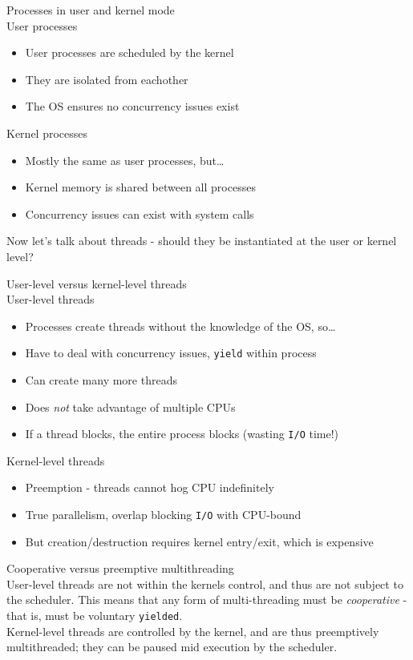 \documentclass[journal, letterpaper]{IEEEtran}
\begin{document}
\begin{theory}{Processes in user and kernel mode} \\
    User processes
    \begin{itemize}
        \item User processes are scheduled by the kernel
        \item They are isolated from eachother
        \item The OS ensures no concurrency issues exist
    \end{itemize}
    Kernel processes
    \begin{itemize}
        \item Mostly the same as user processes, but\dots
        \item Kernel memory is shared between all processes
        \item Concurrency issues can exist with system calls
    \end{itemize}
\end{theory}
Now let's talk about threads - should they be instantiated at the user or kernel level? 
\begin{theory}{User-level versus kernel-level threads} \\
    User-level threads
    \begin{itemize}
        \item Processes create threads without the knowledge of the OS, so\dots
        \item Have to deal with concurrency issues, \verb|yield| within process
        \item Can create many more threads
        \item Does \textit{not} take advantage of multiple CPUs
        \item If a thread blocks, the entire process blocks (wasting \verb|I/O| time!)
    \end{itemize}
    Kernel-level threads
    \begin{itemize}
        \item Preemption - threads cannot hog CPU indefinitely
        \item True parallelism, overlap blocking \verb|I/O| with CPU-bound
        \item But creation/destruction requires kernel entry/exit, which is expensive
    \end{itemize}
\end{theory}
\begin{aside}{Cooperative versus preemptive multithreading} \\
    User-level threads are not within the kernels control, and thus are not subject to the scheduler. This means that
    any form of multi-threading must be \textit{cooperative} - that is, must be voluntary \verb|yielded|.
    \newline \\ 
    Kernel-level threads are controlled by the kernel, and are thus preemptively multithreaded; they can be paused mid execution by the scheduler.
\end{aside}
\end{document}

